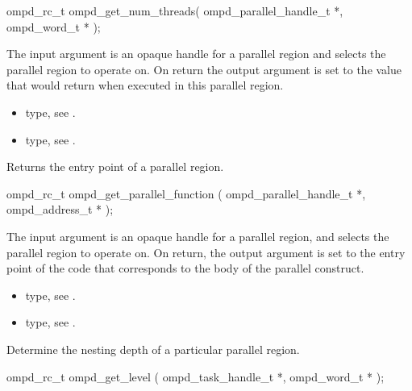 \format
\cspecificstart
\begin{ompSyntax}
ompd_rc_t ompd_get_num_threads(
  ompd_parallel_handle_t *,
  ompd_word_t *
);
\end{ompSyntax}
\cspecificend

\descr

\argdesc
The input argument  is an opaque handle for a parallel region and selects the parallel region to operate on.
On return the output argument  is set to the value that  would return when
executed in this parallel region.

\crossreferences
\begin{itemize}
	\item {} type, see .
	\item {} type, see .
\end{itemize}

\label{ompd:ompd_get_parallel_function}
\summary
Returns the entry point of a parallel region.

\format
\cspecificstart
\begin{ompSyntax}
ompd_rc_t ompd_get_parallel_function (
  ompd_parallel_handle_t *,
  ompd_address_t *
);
\end{ompSyntax}
\cspecificend

\descr

\argdesc
The input argument  is an opaque handle for a
parallel region, and selects the parallel region to operate on.
On return,  the output argument  is set to the
entry point of the code that corresponds to the body of the parallel
construct.

\crossreferences
\begin{itemize}
	\item {} type, see .
	\item {} type, see .
\end{itemize}


\label{ompd:ompd_get_level}
\summary
Determine the nesting depth of a particular parallel region.

\format
\cspecificstart
\begin{ompSyntax}
ompd_rc_t ompd_get_level (
  ompd_task_handle_t *,
  ompd_word_t *
);
\end{ompSyntax}
\cspecificend

